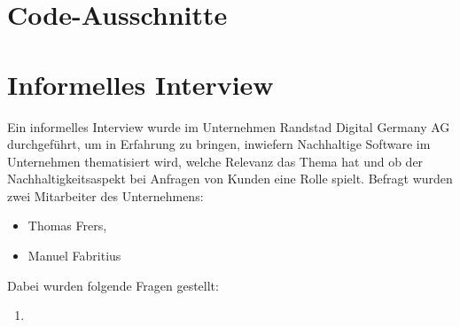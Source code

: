 \chapter{Code-Ausschnitte}




\chapter{Informelles Interview}
Ein informelles Interview wurde im Unternehmen Randstad Digital Germany AG durchgeführt, um in Erfahrung zu bringen, inwiefern Nachhaltige Software im Unternehmen thematisiert wird, welche Relevanz das Thema hat und ob der Nachhaltigkeitsaspekt bei Anfragen von Kunden eine Rolle spielt.
Befragt wurden zwei Mitarbeiter des Unternehmens:
\begin{itemize}
    \item Thomas Frers,
    \item Manuel Fabritius
\end{itemize}
Dabei wurden folgende Fragen gestellt:
\begin{enumerate}
    \item
\end{enumerate}

